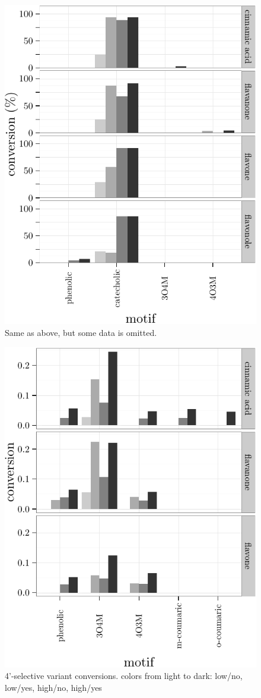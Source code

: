 \documentclass[]{tufte-handout}
\begin{document}
\begin{figure}
 \includegraphics{tufte_files/figure-latex/unnamed-chunk-14-5.pdf}
\caption{Same as above, but some data is omitted.}
\end{figure}\begin{figure}
 \includegraphics{tufte_files/figure-latex/unnamed-chunk-14-6.pdf}
\caption{4'-selective variant conversions. colors from light to dark: low/no, low/yes, high/no, high/yes}
\end{figure}
\end{document}
